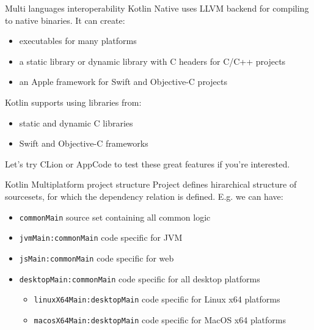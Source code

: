 \documentclass[hyperref={pdfpagelabels=false},xcolor={dvipsnames},compress]{beamer}
\begin{document}
    \begin{frame}{Multi languages interoperability}
        Kotlin Native uses LLVM backend for compiling to native binaries. It can create:
        \begin{itemize}
            \item executables for many platforms \pause
            \item a static library or dynamic library with C headers for C/C++ projects \pause
            \item an Apple framework for Swift and Objective-C projects \pause
        \end{itemize}
        Kotlin supports using libraries from:
        \begin{itemize}
            \item static and dynamic C libraries \pause
            \item Swift and Objective-C frameworks \pause
        \end{itemize}
        Let's try CLion or AppCode to test these great features if you're interested.
    \end{frame}

    \begin{frame}{Kotlin Multiplatform project structure}
        Project defines hirarchical structure of sourcesets, for which the dependency relation is defined.
        E.g. we can have:
        \begin{itemize}
            \item \texttt{commonMain} source set containing all common logic \pause
            \item \texttt{jvmMain:commonMain} code specific for JVM \pause
            \item \texttt{jsMain:commonMain} code specific for web \pause
            \item \texttt{desktopMain:commonMain} code specific for all desktop platforms\pause
            \begin{itemize}
                \item \texttt{linuxX64Main:desktopMain} code specific for Linux x64 platforms \pause
                \item \texttt{macosX64Main:desktopMain} code specific for MacOS x64 platforms
            \end{itemize}
        \end{itemize}
    \end{frame}
\end{document}
